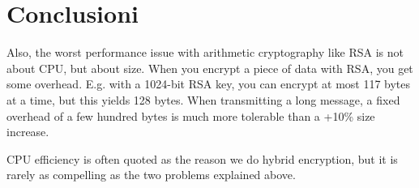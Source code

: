 \chapter{Conclusioni}
\label{cha:conclusioni}

Also, the worst performance issue with arithmetic cryptography like RSA is not about CPU, but about size. When you encrypt a piece of data with RSA, you get some overhead. E.g. with a 1024-bit RSA key, you can encrypt at most 117 bytes at a time, but this yields 128 bytes. When transmitting a long message, a fixed overhead of a few hundred bytes is much more tolerable than a +10\% size increase.

CPU efficiency is often quoted as the reason we do hybrid encryption, but it is rarely as compelling as the two problems explained above.

